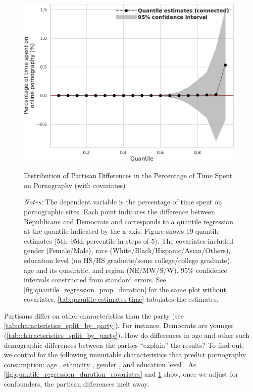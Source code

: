 \documentclass[12pt,twoside]{article}
\begin{document}
\begin{figure}[!ht]
	\centering
	\includegraphics[width=.7\linewidth]{figs/quantile_reg_covariates_proportion_duration_adult.pdf}
	\caption{Distribution of Partisan Differences in the Percentage of Time Spent on Pornography (with covariates)}
	\caption*{\footnotesize \emph{Notes:} 
		The dependent variable is the percentage of time spent on pornographic sites.
		Each point indicates the difference between Republicans and Democrats and corresponds to a quantile regression at the quantile indicated by the x-axis.
  Figure shows 19 quantile estimates (5th--95th percentile in steps of 5).
		The covariates included gender (Female/Male), race (White/Black/Hispanic/Asian/Others), education level (no HS/HS graduate/some college/college graduate), age and its quadratic, and region (NE/MW/S/W).
		95\% confidence intervals constructed from standard errors.
		See \cref{fig:quantile_regression_prop_duration} for the same plot without covariates.
        \cref{tab:quantile-estimates-time} tabulates the estimates.
	}
	\label{fig:quantile_regression_prop_duration_covariates}
\end{figure}

Partisans differ on other characteristics than the party (see \cref{tab:characteristics_split_by_party}). For instance, Democrats are younger (\cref{tab:characteristics_split_by_party}). How do differences in age and other such demographic differences between the parties ``explain'' the results? To find out, we control for the following immutable characteristics that predict pornography consumption: age \citep{Wright2013-an, Woodrum1992-vk}, ethnicity \citep{Wright2013-an}, gender \citep{Woodrum1992-vk}, and education level \citep{Woodrum1992-vk}. As \cref{fig:quantile_regression_duration_covariates} and \cref{fig:quantile_regression_prop_duration_covariates} show, once we adjust for confounders, the partisan differences melt away. 
\end{document}
